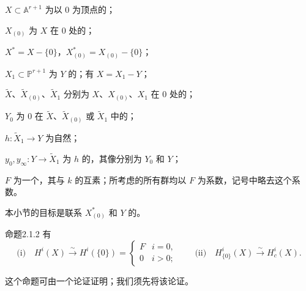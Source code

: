 $X\subset\mathbb A^{r+1}$ 为以 $0$ 为顶点的；

$X_{(0)}$ 为 $X$ 在 $0$ 处的；

$X^*=X-\{0\}$，$X^*_{(0)}=X_{(0)}-\{0\}$；

$X_1\subset\mathbb P^{r+1}$ 为 $Y$ 的；有 $X=X_1-Y$；

$\widetilde X$、$\widetilde X_{(0)}$、$\widetilde X_1$ 分别为 $X$、$X_{(0)}$、$X_1$ 在 $0$ 处的；

$Y_0$ 为 $0$ 在 $\widetilde X$、$\widetilde X_{(0)}$ 或 $\widetilde X_1$ 中的；

$h:\widetilde X_1\to Y$ 为自然；

$y_0,y_\infty:Y\to\widetilde X_1$ 为 $h$ 的，其像分别为 $Y_0$ 和 $Y$；

$F$ 为一个，其与 $k$ 的互素；所考虑的所有群均以 $F$ 为系数，记号中略去这个系数。

本小节的目标是联系 $X^*_{(0)}$ 和 $Y$ 的。
\begin{SGAresult}{命题}{2.1.2}
有
\[
\text{(i)}\quad H^i(X)\xrightarrow{\sim}H^i(\{0\})=
\begin{cases}F&i=0,\\0&i>0;\end{cases}
\qquad
\text{(ii)}\quad H^i_{\{0\}}(X)\xrightarrow{\sim}H_c^i(X).
\]
\end{SGAresult}
这个命题可由一个论证证明；我们须先将该论证。

